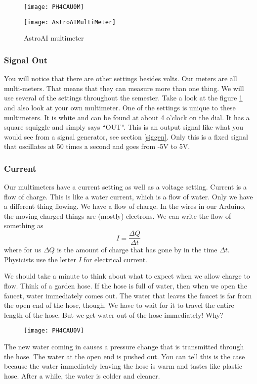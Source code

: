 \begin{figure}[h!]
	\texttt{[image: PH4CAU0M]}
\end{figure}

\begin{figure}[h!]
	\caption{AstroAI multimeter \label{AstroAI}}
	\texttt{[image: AstroAIMultiMeter]}
\end{figure}
\subsubsection{Signal Out}
You will notice that there are other settings besides volts. Our meters are all multi-meters. That means that they can measure more than one thing. We will use several of the settings throughout the semester. Take a look at the figure \ref{AstroAI} and also look at your own multimeter. One of the settings is unique to these multimeters.  It is white and can be found at about 4 o'clock on the dial. It has a square squiggle and simply says ``OUT''. This is an output signal like what you would see from a signal generator, see section \ref{siggen}. Only this is a fixed signal that oscillates at 50 times a second and goes from -5V to 5V. 

\subsubsection{Current}

Our multimeters have a current setting as well as a voltage setting. Current
is a flow of charge. This is like a water current, which is a flow of water.
Only we have a different thing flowing. We have a flow of charge. In the
wires in our Arduino, the moving charged things are (mostly) electrons. We
can write the flow of something as 
\begin{equation*}
I=\frac{\Delta Q}{\Delta t}
\end{equation*}%
where for us $\Delta Q$ is the amount of charge that has gone by in the time 
$\Delta t.$ Physicists use the letter $I$ for electrical current.

We should take a minute to think about what to expect when we allow charge
to flow. Think of a garden hose. If the hose is full of water, then when we
open the faucet, water immediately comes out. The water that leaves the
faucet is far from the open end of the hose, though. We have to wait for it
to travel the entire length of the hose. But we get water out of the hose
immediately! Why? \begin{figure}[h!]
	\texttt{[image: PH4CAU0V]}
\end{figure}The new water coming in causes a
pressure change that is transmitted through the hose. The water at the open
end is pushed out. You can tell this is the case because the water
immediately leaving the hose is warm and tastes like plastic hose. After a
while, the water is colder and cleaner.

